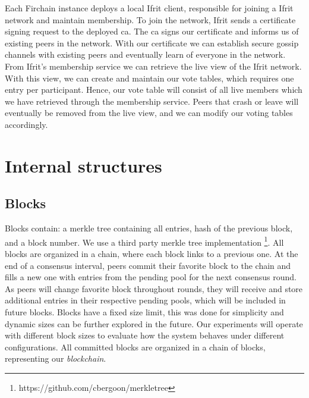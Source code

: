 \documentclass[USenglish]{uit-thesis}
\begin{document}
Each Firchain instance deploys a local Ifrit client, responsible for joining a Ifrit network and maintain membership.
To join the network, Ifrit sends a certificate signing request to the deployed \gls{ca}.
The \gls{ca} signs our certificate and informs us of existing peers in the network.
With our certificate we can establish secure gossip channels with existing peers and eventually learn of everyone in the network. 
From Ifrit's membership service we can retrieve the live view of the Ifrit network.
With this view, we can create and maintain our vote tables, which requires one entry per participant.
Hence, our vote table will consist of all live members which we have retrieved through the membership service.  
Peers that crash or leave will eventually be removed from the live view, and we can modify our voting tables accordingly.



\section{Internal structures}
\subsection{Blocks}
Blocks contain: a merkle tree containing all entries, hash of the previous block, and a block number.
We use a third party merkle tree implementation \footnote{https://github.com/cbergoon/merkletree}.  
All blocks are organized in a chain, where each block links to a previous one.
At the end of a consensus interval, peers commit their favorite block to the chain and fills a new one with entries from the pending pool for the next consensus round.
As peers will change favorite block throughout rounds, they will receive and store additional entries in their respective pending pools, which will be included in future blocks.
Blocks have a fixed size limit, this was done for simplicity and dynamic sizes can be further explored in the future.
Our experiments will operate with different block sizes to evaluate how the system behaves under different configurations.
All committed blocks are organized in a chain of blocks, representing our \textit{blockchain}.
\end{document}
